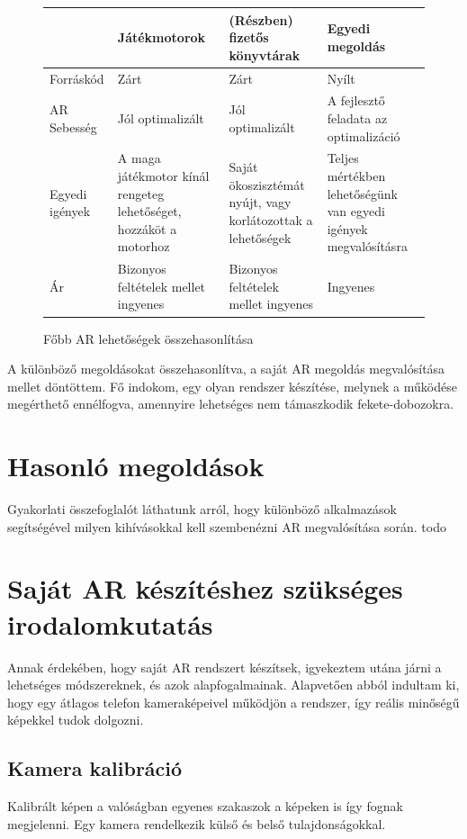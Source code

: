 \documentclass[12pt,a4paper,oneside]{report} %
\begin{document}
\begin{figure}[H]
	\centering
	\begin{tabular}{s|p{3.5cm}|p{3.5cm}|p{3.5cm} }
	& Játékmotorok &(Részben) fizetős könyvtárak &  Egyedi megoldás \\
	\hline
	Forráskód & Zárt & Zárt & Nyílt \\
	AR Sebesség & Jól optimalizált & Jól optimalizált & A fejlesztő feladata az optimalizáció \\
	Egyedi igények   & A maga játékmotor kínál rengeteg lehetőséget, hozzáköt a motorhoz & Saját ökoszisztémát nyújt, vagy korlátozottak a lehetőségek   & Teljes mértékben lehetőségünk van egyedi igények megvalósításra  \\
	Ár & Bizonyos feltételek mellet ingyenes & Bizonyos feltételek mellet ingyenes & Ingyenes\\

	\end{tabular}
	\caption{Főbb AR lehetőségek összehasonlítása}
\end{figure}

A különböző megoldásokat összehasonlítva, a saját AR megoldás megvalósítása mellet döntöttem. Fő indokom, egy olyan rendszer készítése, melynek a működése megérthető ennélfogva, amennyire lehetséges nem támaszkodik fekete-dobozokra.
\section{Hasonló megoldások}

Gyakorlati \cite{prochazka2011augmented} összefoglalót láthatunk  arról, hogy különböző alkalmazások segítségével milyen kihívásokkal kell szembenézni AR megvalósítása során. 
todo
\section{Saját AR készítéshez szükséges irodalomkutatás}
Annak érdekében, hogy saját AR rendszert készítsek, igyekeztem utána járni a lehetséges módszereknek, és azok alapfogalmainak.
Alapvetően abból indultam ki, hogy egy átlagos telefon kameraképeivel működjön a rendszer, így reális minőségű képekkel tudok dolgozni.
\subsection{Kamera kalibráció}
Kalibrált képen a valóságban egyenes szakaszok a képeken is így fognak megjelenni. Egy kamera rendelkezik külső és belső tulajdonságokkal. 
\end{document}
